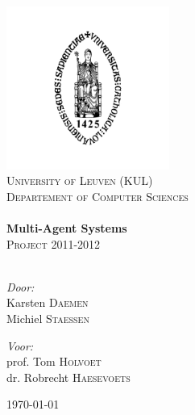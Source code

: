 \begin{titlepage}

\begin{center}


\includegraphics[width=0.40\textwidth]{./logo}\\[1cm]    

\textsc{\LARGE University of Leuven (KUL)}\\[0.3cm]

\textsc{\Large Departement of Computer Sciences}\\[2.0cm]


\HRule \\[0.4cm]
{ \huge \bfseries Multi-Agent Systems}\\[0.2cm]
\textsc{ \Large Project 2011-2012}\\[0.4cm]
\HRule \\[2.5cm]

\begin{minipage}{0.4\textwidth}
\begin{flushleft} \large
\emph{Door:}\\
Karsten \textsc{Daemen}\\
Michiel \textsc{Staessen}

\end{flushleft}
\end{minipage}
\begin{minipage}{0.5\textwidth}
\begin{flushright} \large
\emph{Voor:} \\
prof. Tom \textsc{Holvoet} \\
dr. Robrecht \textsc{Haesevoets}
\end{flushright}
\end{minipage}

\vfill

{\large \today}

\end{center}

\end{titlepage}